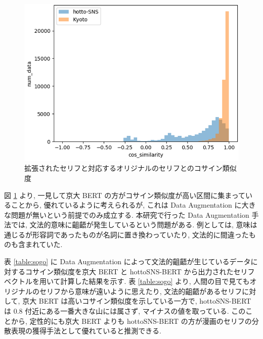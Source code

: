 \begin{figure}[!h]
  \centering
  \includegraphics[width=0.8\hsize]{doc/figures/cos_bert.png}
  \caption{拡張されたセリフと対応するオリジナルのセリフとのコサイン類似度}
  \label{fig:cos_bert}
\end{figure}

\newpage
図 \ref{fig:cos_bert} より, 一見して京大 BERT の方がコサイン類似度が高い区間に集まっていることから, 優れているように考えられるが, これは Data Augmentation に大きな問題が無いという前提でのみ成立する. 本研究で行った Data Augmentation 手法では, 文法的意味に齟齬が発生しているという問題がある. 例としては, 意味は通じるが形容詞であったものが名詞に置き換わっていたり, 文法的に間違ったものも含まれていた.

表 \ref{table:sogo} に Data Augmentation によって文法的齟齬が生じているデータに対するコサイン類似度を京大 BERT と hottoSNS-BERT から出力されたセリフベクトルを用いて計算した結果を示す. 表 \ref{table:sogo} より, 人間の目で見てもオリジナルのセリフから意味が遠いように思えたり, 文法的齟齬があるセリフに対して, 京大 BERT は高いコサイン類似度を示している一方で, hottoSNS-BERT は $0.8$ 付近にある一番大きな山には属さず, マイナスの値を取っている. このことから, 定性的にも京大 BERT よりも hottoSNS-BERT の方が漫画のセリフの分散表現の獲得手法として優れていると推測できる.

